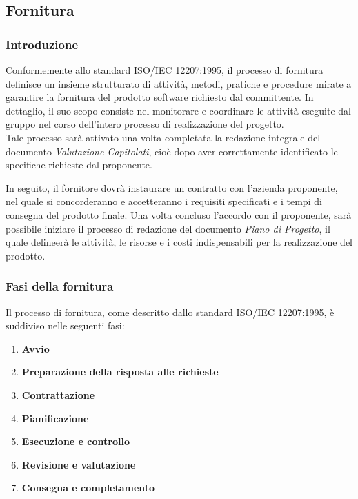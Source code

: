 \subsection{Fornitura}
\subsubsection{Introduzione}
Conformemente allo standard \href{https://www.math.unipd.it/~tullio/IS-1/2009/Approfondimenti/ISO_12207-1995.pdf}{ISO/IEC 12207:1995}, il processo di fornitura definisce un insieme strutturato di attività, metodi, pratiche e procedure mirate a garantire la fornitura del prodotto software richiesto dal committente. 
In dettaglio, il suo scopo consiste nel monitorare e coordinare le attività eseguite dal gruppo nel corso dell'intero processo di realizzazione del progetto.\\
Tale processo sarà attivato una volta completata la redazione integrale del documento \textit{Valutazione Capitolati}, cioè dopo aver correttamente identificato le specifiche richieste dal proponente.

In seguito, il fornitore dovrà instaurare un contratto con l'azienda proponente, nel quale si concorderanno e accetteranno i requisiti specificati e i tempi di consegna del prodotto finale. Una volta concluso l'accordo con il proponente, sarà possibile iniziare il processo di redazione del documento
\textit{Piano di Progetto}, il quale delineerà le attività, le risorse e i costi indispensabili per la realizzazione del prodotto.

\subsubsection{Fasi della fornitura}
Il processo di fornitura, come descritto dallo standard \href{https://www.math.unipd.it/~tullio/IS-1/2009/Approfondimenti/ISO_12207-1995.pdf}{ISO/IEC 12207:1995}, è suddiviso nelle seguenti fasi:
\begin{enumerate}
    \item \textbf{Avvio}
    \item \textbf{Preparazione della risposta alle richieste}
    \item \textbf{Contrattazione}
    \item \textbf{Pianificazione}
    \item \textbf{Esecuzione e controllo}
    \item \textbf{Revisione e valutazione}
    \item \textbf{Consegna e completamento}
\end{enumerate}

